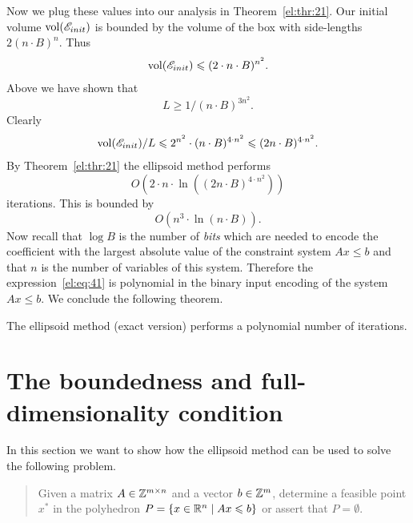 Now we plug these values into our analysis in
Theorem~\ref{el:thr:21}. Our initial volume $\mathrm{vol}(\mathscr{E}_{init})$  is bounded by   the
volume of the box with side-lengths $2 (n\cdot B)^n$. Thus
\begin{equation}
  \label{el:eq:27}
  \mathrm{vol}(\mathscr{E}_{init}) \leqslant(2\cdot n\cdot B)^{n^2}.  
\end{equation}
%
Above we have shown that 
\begin{equation}
  \label{el:eq:38}
  L \geq 1 / (n\cdot B)^{3n^2}. 
\end{equation}
Clearly 
\begin{equation}
  \label{el:eq:39}
   \mathrm{vol}(\mathscr{E}_{init}) / L  \leqslant 2^{n^2} \cdot (n \cdot B)^{4 \cdot n^2} 
   \leqslant (2n \cdot B)^{4\cdot n^2}. 
\end{equation}
%
By Theorem~\ref{el:thr:21} the ellipsoid method performs 
\begin{equation}
  \label{el:eq:40}
  O\left(2\cdot n \cdot \ln \left((2n \cdot B)^{4\cdot n^2}\right) \right)
\end{equation}
iterations. This is bounded by 
\begin{equation}
  \label{el:eq:41}
  O(n^3 \cdot \ln (n \cdot B)).
\end{equation}
Now recall that $\log B$ is the number of \emph{bits}  which are
needed to encode the coefficient with the largest absolute value of
the constraint system $Ax\leq b$ and that $n$ is the number of variables
of this system. Therefore the expression~\eqref{el:eq:41} is polynomial
in the binary input encoding of the system $Ax\leq b$. We conclude the
following theorem. 

\begin{theorem}
  \label{el:thr:23}
  The ellipsoid method (exact version)  performs a polynomial number
  of iterations.  
\end{theorem}




\section{The boundedness and full-dimensionality condition}
\label{el:sec:bound-full-dimens}



In this section we want to show how the ellipsoid method can be used
to solve the following problem. 
\begin{quote}
  Given a matrix $A \in \mathbb{Z}^{m\times n}$ and a vector $b \in \mathbb{Z}^m$, determine a
  feasible point $x^*$ in the polyhedron $P = \{ x \in \mathbb{R}^n \mid Ax\leqslant b\}$ or
  assert that $P = \emptyset$. 
\end{quote}
%
